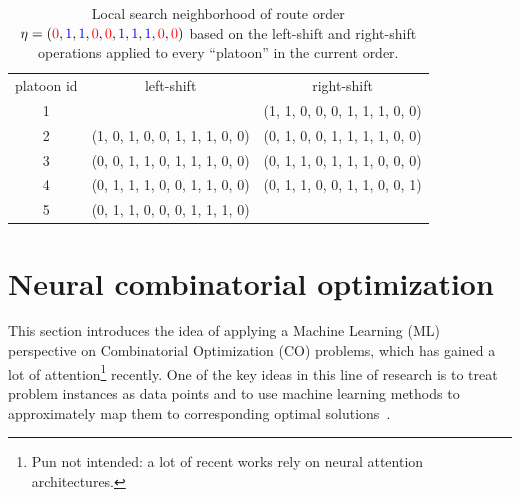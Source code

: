 \documentclass[a4paper]{report}
\theoremstyle{definition}
\theoremstyle{plain}
\begin{document}
\newcommand*{\one}{{\color{blue}1}}%
\newcommand*{\zero}{{\color{red}0}}%

\begin{table}
  \caption{Local search neighborhood of route order
    $\eta = (\zero, \one, \one, \zero, \zero, \one, \one, \one, \zero, \zero)$
    based on the left-shift and right-shift operations applied to every
    ``platoon'' in the current order.}
\label{tab:local_search}
\begin{center}
\begin{tabular}{c|c|c}
  platoon id  & left-shift & right-shift \\
  1 &  & (\one, \one, \zero, \zero, \zero, \one, \one, \one, \zero, \zero) \\
  2 & (\one, \zero, \one, \zero, \zero, \one, \one, \one, \zero, \zero) & (\zero, \one, \zero, \zero, \one, \one, \one, \one, \zero, \zero) \\
  3 & (\zero, \zero, \one, \one, \zero, \one, \one, \one, \zero, \zero) & (\zero, \one, \one, \zero, \one, \one, \one, \zero, \zero, \zero) \\
  4 & (\zero, \one, \one, \one, \zero, \zero, \one, \one, \zero, \zero) & (\zero, \one, \one, \zero, \zero, \one, \one, \zero, \zero, \one) \\
  5 & (\zero, \one, \one, \zero, \zero, \zero, \one, \one, \one, \zero) &
\end{tabular}
\end{center}
\end{table}



\chapter{Neural combinatorial optimization}\label{app:nco}


This section introduces the idea of applying a Machine Learning (ML) perspective
on Combinatorial Optimization (CO) problems, which has gained a lot of
attention\footnote{Pun not intended: a lot of recent works rely on neural attention architectures.} recently. One of the key ideas in this line of research is to treat problem
instances as data points and to use machine learning methods to approximately
map them to corresponding optimal solutions~\cite{bengioMachineLearningCombinatorial2020}.
\end{document}
